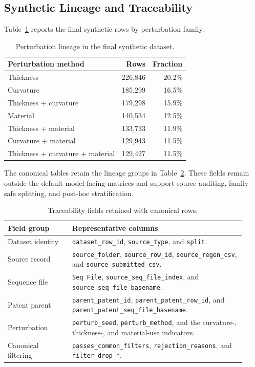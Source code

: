 \subsection{Synthetic Lineage and Traceability}
\label{app:synthetic_lineage_details}

Table~\ref{tab:perturbation_method_counts} reports the final synthetic rows by perturbation family.

\begin{table}[htbp]
\centering
\small
\caption{Perturbation lineage in the final synthetic dataset.}
\label{tab:perturbation_method_counts}
\begin{tabular}{lrr}
\toprule
\textbf{Perturbation method} & \textbf{Rows} & \textbf{Fraction} \\
\midrule
Thickness & 226,846 & 20.2\% \\
Curvature & 185,299 & 16.5\% \\
Thickness + curvature & 179,298 & 15.9\% \\
Material & 140,534 & 12.5\% \\
Thickness + material & 133,733 & 11.9\% \\
Curvature + material & 129,943 & 11.5\% \\
Thickness + curvature + material & 129,427 & 11.5\% \\
\bottomrule
\end{tabular}
\end{table}

The canonical tables retain the lineage groups in Table~\ref{tab:traceability_fields}. These fields remain outside the default model-facing matrices and support source auditing, family-safe splitting, and post-hoc stratification.

\begin{table}[htbp]
\centering
\small
\caption{Traceability fields retained with canonical rows.}
\label{tab:traceability_fields}
\begin{tabular}{@{}p{0.25\linewidth}p{0.67\linewidth}@{}}
\toprule
\textbf{Field group} & \textbf{Representative columns} \\
\midrule
Dataset identity & \texttt{dataset\_row\_id}, \texttt{source\_type}, and \texttt{split}. \\
Source record & \texttt{source\_folder}, \texttt{source\_row\_id}, \texttt{source\_regen\_csv}, and \texttt{source\_submitted\_csv}. \\
Sequence file & \texttt{Seq File}, \texttt{source\_seq\_file\_index}, and \texttt{source\_seq\_file\_basename}. \\
Patent parent & \texttt{parent\_patent\_id}, \texttt{parent\_patent\_row\_id}, and \texttt{parent\_patent\_seq\_file\_basename}. \\
Perturbation & \texttt{perturb\_seed}, \texttt{perturb\_method}, and the curvature-, thickness-, and material-use indicators. \\
Canonical filtering & \texttt{passes\_common\_filters}, \texttt{rejection\_reasons}, and \texttt{filter\_drop\_*}. \\
\bottomrule
\end{tabular}
\end{table}

